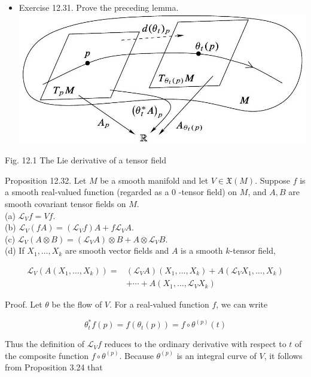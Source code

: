 \documentclass[10pt, letterpaper]{article}
\begin{document}
\begin{itemize}
  \item Exercise 12.31. Prove the preceding lemma.\\
\includegraphics[scale=0.2, center]{2025_06_02_90020b9676379491a6e7g-340}
\end{itemize}

Fig. 12.1 The Lie derivative of a tensor field

Proposition 12.32. Let $M$ be a smooth manifold and let $V \in \mathfrak{X}(M)$. Suppose $f$ is a smooth real-valued function (regarded as a 0 -tensor field) on $M$, and $A, B$ are smooth covariant tensor fields on $M$.\\
(a) $\mathscr{L}_{V} f=V f$.\\
(b) $\mathscr{L}_{V}(f A)=\left(\mathscr{L}_{V} f\right) A+f \mathscr{L}_{V} A$.\\
(c) $\mathscr{L}_{V}(A \otimes B)=\left(\mathscr{L}_{V} A\right) \otimes B+A \otimes \mathscr{L}_{V} B$.\\
(d) If $X_{1}, \ldots, X_{k}$ are smooth vector fields and $A$ is a smooth $k$-tensor field,

$$
\begin{aligned}
\mathscr{L}_{V}\left(A\left(X_{1}, \ldots, X_{k}\right)\right)= & \left(\mathscr{L}_{V} A\right)\left(X_{1}, \ldots, X_{k}\right)+A\left(\mathscr{L}_{V} X_{1}, \ldots, X_{k}\right) \\
& +\cdots+A\left(X_{1}, \ldots, \mathscr{L}_{V} X_{k}\right)
\end{aligned}
$$

Proof. Let $\theta$ be the flow of $V$. For a real-valued function $f$, we can write

$$
\theta_{t}^{*} f(p)=f\left(\theta_{t}(p)\right)=f \circ \theta^{(p)}(t)
$$

Thus the definition of $\mathscr{L}_{V} f$ reduces to the ordinary derivative with respect to $t$ of the composite function $f \circ \theta^{(p)}$. Because $\theta^{(p)}$ is an integral curve of $V$, it follows from Proposition 3.24 that
\end{document}
